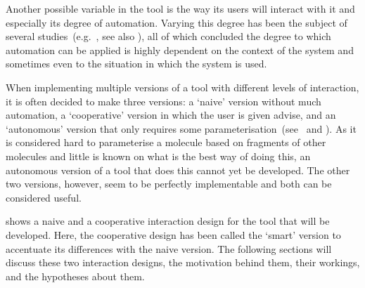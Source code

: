 
Another possible variable in the tool is the way its users will interact with it and especially its degree of automation. Varying this degree has been the subject of several studies~(e.g.~\cite{payne2000varying, horvitz1999principles, marcus1987taking, norman1990problem}, see also ), all of which concluded the degree to which automation can be applied is highly dependent on the context of the system and sometimes even to the situation in which the system is used.

When implementing multiple versions of a tool with different levels of interaction, it is often decided to make three versions: a `naive' version without much automation, a `cooperative' version in which the user is given advise, and an `autonomous' version that only requires some parameterisation~(see~\cite{payne2000varying} and ). As it is considered hard to parameterise a molecule based on fragments of other molecules and little is known on what is the best way of doing this, an autonomous version of a tool that does this cannot yet be developed. The other two versions, however, seem to be perfectly implementable and both can be considered useful.

 shows a naive and a cooperative interaction design for the tool that will be developed. Here, the cooperative design has been called the `smart' version to accentuate its differences with the naive version. The following sections will discuss these two interaction designs, the motivation behind them, their workings, and the hypotheses about them.

